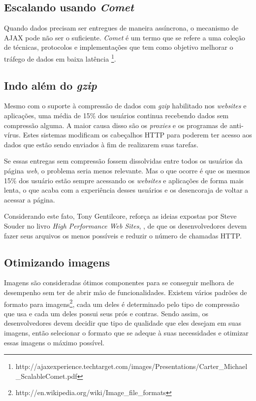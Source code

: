 \subsection{Escalando usando \textit{Comet}}
\label{subsec:evenfaster_cap8}
Quando dados precisam ser entregues de maneira assíncrona, o mecanismo de AJAX pode não ser o suficiente. \textit{Comet} é um termo que se refere a uma coleção de técnicas, protocolos e implementações que tem como objetivo melhorar o tráfego de dados em baixa latência \footnote{http://ajaxexperience.techtarget.com/images/Presentations/Carter\_Michael\_ScalableComet.pdf}.

\subsection{Indo além do \textit{gzip}}
\label{subsec:evenfaster_cap9}
Mesmo com o suporte à compressão de dados com \textit{gzip} habilitado nos \textit{websites} e aplicações, uma média de 15\% dos usuários continua recebendo dados sem compressão alguma. A maior causa disso são os \textit{proxies} e os programas de anti-vírus. Estes sistemas modificam os cabeçalhos HTTP para poderem ter acesso aos dados que estão sendo enviados à fim de realizarem suas tarefas.

Se essas entregas sem compressão fossem dissolvidas entre todos os usuários da página \textit{web}, o problema seria menos relevante. Mas o que ocorre é que os mesmos 15\% dos usuário estão sempre acessando os \textit{websites} e aplicações de forma mais lenta, o que acaba com a experiência desses usuários e os desencoraja de voltar a acessar a página.

Considerando este fato, Tony Gentilcore, reforça as ideias expostas por Steve Souder no livro \textit{High Performance Web Sites}, \cite{HighPerformance}, de que os desenvolvedores devem fazer seus arquivos os menos possíveis e reduzir o número de chamadas HTTP.

\subsection{Otimizando imagens}
\label{subsec:evenfaster_cap10}
Imagens são consideradas ótimos componentes para se conseguir melhora de desempenho sem ter de abrir mão de funcionalidades. Existem vários padrões de formato para imagens\footnote{http://en.wikipedia.org/wiki/Image\_file\_formats}, cada um deles é determinado pelo tipo de compressão que usa e cada um deles possui seus prós e contras. Sendo assim, os desenvolvedores devem decidir que tipo de qualidade que eles desejam em suas imagens, então selecionar o formato que se adeque à suas necessidades e otimizar essas imagens o máximo possível.

